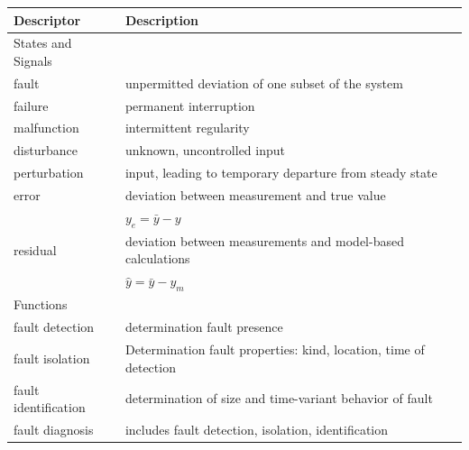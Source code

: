 \begin{table}[!h]
    \centering
    \begin{tabular}{@{}ll@{}}
        \toprule
        Descriptor            & Description                                                                               \\ \midrule
        States and Signals    &                                                                                           \\ \midrule
        fault                 & unpermitted deviation of one subset of the system                                         \\
        failure               & permanent interruption                                                                    \\
        malfunction           & intermittent regularity                                                                   \\
        disturbance           & unknown, uncontrolled input                                                               \\
        perturbation          & input, leading to temporary departure from steady state                                   \\
        error                 & deviation between measurement and true value                                              \\              & $y_e = \bar{y} -y$                               \\
        residual             & deviation between measurements and model-based calculations                                                                                           \\       & $\hat{y} = \bar{y} -y_m$                                                              \\ \bottomrule
        Functions       &                         \\ \midrule
        fault detection  & determination fault presence                                  \\
        fault isolation       & Determination fault properties: kind, location, time of detection                                       \\
        fault identification            & determination of size and time-variant behavior of fault                               \\
        fault diagnosis           & includes fault detection, isolation, identification                         \\

\end{tabular}
\end{table}
